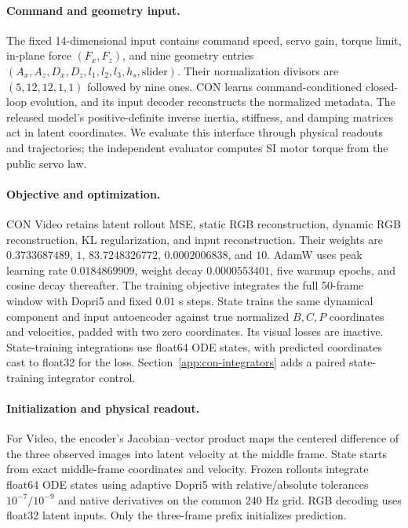 \documentclass[10pt,twocolumn,letterpaper]{article}
\begin{document}
\paragraph{Command and geometry input.}
The fixed 14-dimensional input contains command speed, servo gain, torque limit, in-plane force $(F_x,F_z)$, and nine geometry entries $(A_x,A_z,D_x,D_z,l_1,l_2,l_3,h_s,\mathrm{slider})$. Their normalization divisors are $(5,12,12,1,1)$ followed by nine ones. CON learns command-conditioned closed-loop evolution, and its input decoder reconstructs the normalized metadata. The released model's positive-definite inverse inertia, stiffness, and damping matrices act in latent coordinates. We evaluate this interface through physical readouts and trajectories; the independent evaluator computes SI motor torque from the public servo law.

\paragraph{Objective and optimization.}
CON Video retains latent rollout MSE, static RGB reconstruction, dynamic RGB reconstruction, KL regularization, and input reconstruction. Their weights are $0.3733687489$, $1$, $83.7248326772$, $0.0002006838$, and $10$. AdamW uses peak learning rate $0.0184869909$, weight decay $0.0000553401$, five warmup epochs, and cosine decay thereafter. The training objective integrates the full 50-frame window with Dopri5 and fixed $0.01$ s steps. State trains the same dynamical component and input autoencoder against true normalized $B,C,P$ coordinates and velocities, padded with two zero coordinates. Its visual losses are inactive. State-training integrations use float64 ODE states, with predicted coordinates cast to float32 for the loss. Section~\ref{app:con-integrators} adds a paired state-training integrator control.

\paragraph{Initialization and physical readout.}
For Video, the encoder's Jacobian--vector product maps the centered difference of the three observed images into latent velocity at the middle frame. State starts from exact middle-frame coordinates and velocity. Frozen rollouts integrate float64 ODE states using adaptive Dopri5 with relative/absolute tolerances $10^{-7}/10^{-9}$ and native derivatives on the common 240 Hz grid. RGB decoding uses float32 latent inputs. Only the three-frame prefix initializes prediction.
\end{document}
